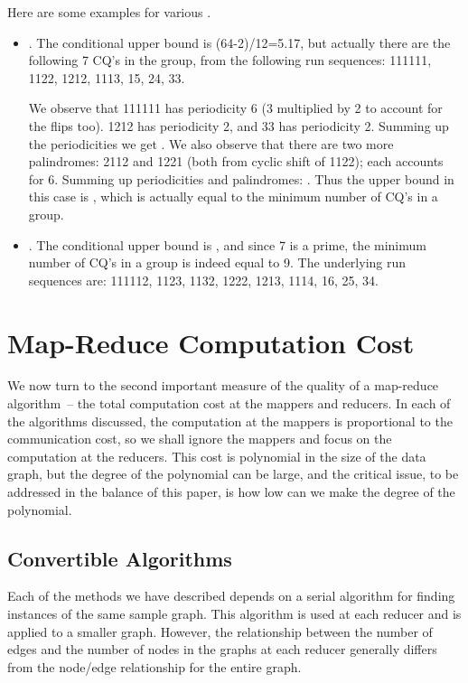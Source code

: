 \begin{example}
Here are some examples for various .

\begin{itemize}
\item .  The conditional upper bound is (64-2)/12=5.17, but actually there are the following 7 CQ's in the group, from the following run sequences:
 111111,
 1122,
 1212,
 1113,
 15,
 24,
 33.

We observe that 111111 has periodicity 6 (3 multiplied by 2 to account for the flips too).
1212 has periodicity 2, and 33 has periodicity 2.  Summing up the
periodicities we get .
We also observe that there are two more palindromes: 2112 and
1221 (both from cyclic shift of 1122); each accounts for 6.
Summing up periodicities and palindromes: .
Thus the upper bound
in this case is , which is actually equal to the
minimum number of CQ's in a group.

\item .  The conditional upper bound is , and since 7 is a prime,
the minimum number of CQ's in a group is indeed equal to 9.
The underlying run sequences are:
 111112,
 1123,
 1132,
 1222,
 1213,
 1114,
 16,
 25,
 34.

\end{itemize}
\end{example}

\section{Map-Reduce Computation Cost}
\label{comp-cost-sect}

We now turn to the second important measure of the quality of a map-reduce algorithm~-- the total computation cost at the mappers and reducers.  In each of the algorithms discussed, the computation at the mappers is proportional to the communication cost, so we shall ignore the mappers and focus on the computation at the reducers.  This cost is polynomial in the size of the data graph, but the degree of the polynomial can be large, and the critical issue, to be addressed in the balance of this paper, is how low can we make the degree of the polynomial.

\subsection{Convertible Algorithms}
\label{conv-alg-subsect}

Each of the methods we have described depends on a serial algorithm for finding instances of the same sample graph.  This algorithm is used at each reducer and is applied to a smaller graph.
However, the relationship between the number of edges and the number of nodes in the graphs at each reducer generally differs from the node/edge relationship for the entire graph.

